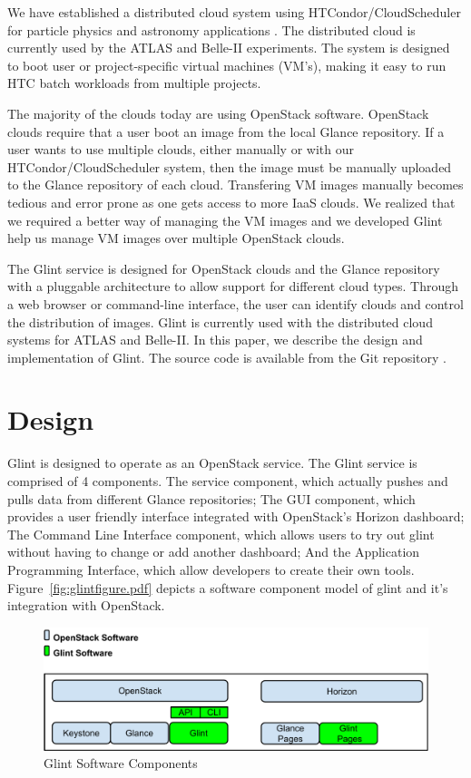 \documentclass[a4paper]{jpconf}
\begin{document}
We have established a distributed cloud system using HTCondor/CloudScheduler for
particle physics and astronomy applications \cite{hpcs:cloudpaper, sobie-nyc-cloud}.
The distributed cloud is currently used by the ATLAS \cite{ryan-chep} 
and Belle-II \cite{sobie-chep} experiments.
The system is designed to boot user or project-specific virtual machines (VM's),
making it easy to run HTC batch workloads from multiple projects.

The majority of the clouds today are using OpenStack software.
OpenStack clouds require that a user boot an image from the local Glance repository.
If a user wants to use multiple clouds, either manually or with our 
HTCondor/CloudScheduler system, then the image must be manually uploaded 
to the Glance repository of each cloud.
Transfering VM images manually becomes tedious and error prone as one gets access
to more IaaS clouds.
We realized that we required a better way of managing the VM images and we 
developed Glint help us manage VM images over multiple OpenStack clouds.

The Glint service is designed for OpenStack clouds and the Glance repository
with a pluggable architecture to allow support for different cloud types.
Through a web browser or command-line interface, the user can identify clouds 
and control the distribution of images.
Glint is currently used with the distributed cloud systems for ATLAS and Belle-II.
In this paper, we describe the design and implementation of Glint.
The source code is available from the Git repository \cite{glint}.



\section{Design}
Glint is designed to operate as an OpenStack service. The Glint service is comprised of 4 components. The service component, which actually pushes and pulls data from different Glance repositories; The GUI component, which provides a user friendly interface integrated with OpenStack's Horizon dashboard; The Command Line Interface component, which allows users to try out glint without having to change or add another dashboard; And the Application Programming Interface, which allow developers to create their own tools. Figure~\ref{fig:glintfigure.pdf} depicts a software component model of glint and it's integration with OpenStack. 

\begin{figure}[ht]
\begin{center}
\includegraphics[width=36pc]{images/glintdesign.pdf}
\caption{\label{fig:glintfigure}Glint Software Components}
\end{center}
\end{figure}
\end{document}
